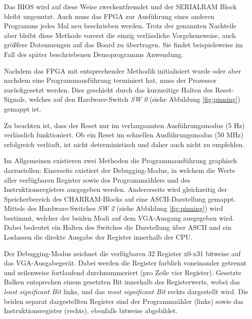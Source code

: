 Das BIOS wird auf diese Weise zweckentfremdet und der SERIALRAM Block bleibt ungenutzt. Auch muss das FPGA zur Ausf\"uhrung eines anderen Programms jedes Mal neu beschrieben werden. Trotz der genannten Nachteile aber bleibt diese Methode vorerst die einzig verl\"assliche Vorgehensweise, auch gr\"o\ss{}fere Datenmengen auf das Board zu \"ubertragen. Sie findet beispielsweise im Fall des sp\"ater beschriebenen Demoprogramms Anwendung.


Nachdem das FPGA mit entsprechender Methodik initialisiert wurde oder aber nachdem eine Programmausf\"uhrung terminiert hat, muss der Prozessor zur\"uckgesetzt werden. Dies geschieht durch das kurzzeitige Halten des Reset-Signals, welches auf den Hardware-Switch \textit{SW 0} (siehe Abbildung \ref{fig:pinning}) gemappt ist.

Zu beachten ist, dass der Reset nur im verlangsamten Ausf\"uhrungsmodus (5 Hz) verl\"asslich funktioniert. Ob ein Reset im schnellen Ausf\"uhrungsmodus (50 MHz) erfolgreich verl\"auft, ist nicht deterministisch und daher auch nicht zu empfehlen.


Im Allgemeinen existieren zwei Methoden die Programmausf\"uhrung graphisch darzustellen: Einerseits existiert der Debugging-Modus, in welchem die Werte aller verf\"ugbaren Register sowie des Programmz\"ahlers und des Instruktionsregisters ausgegeben werden. Andererseits wird gleichzeitig der Speicherbereich des CHARRAM-Blocks auf eine ASCII-Darstellung gemappt. Mittels des Hardware-Switches \textit{SW 2} (siehe Abbildung \ref{fig:pinning}) wird bestimmt, welcher der beiden Modi auf dem VGA-Ausgang ausgegeben wird. Dabei bedeutet ein Halten des Switches die Darstellung \"uber ASCII und ein Loslassen die direkte Ausgabe der Register innerhalb der CPU.


Der Debugging-Modus zeichnet die verf\"ugbaren 32 Register x0-x31 bitweise auf das VGA-Ausgabeger\"at. Dabei werden die Register farblich voneinander getrennt und zeilenweise fortlaufend durchnummeriert (pro Zeile vier Register). Gesetzte Balken entsprechen einem gesetzten Bit innerhalb des Registerwerts, wobei das \textit{least significant Bit} links, und das \textit{most significant Bit} rechts dargestellt wird.
Die beiden separat dargestellten Register sind der Programmz\"ahler (links) sowie das Instruktionsregister (rechts), ebenfalls bitweise abgebildet.

